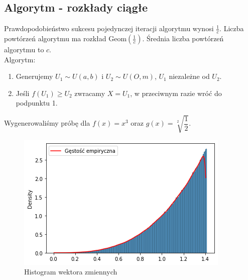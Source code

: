 \documentclass[12pt]{mwart}
\begin{document}
	\subsection{Algorytm - rozkłady ciągłe}
	\noindent Prawdopodobieństwo sukcesu pojedynczej iteracji algorytmu wynosi $\frac{1}{c}$. Liczba powtórzeń algorytmu ma rozkład $\mathrm{Geom}(\frac{1}{c})$. Średnia liczba powtórzeń algorytmu to $c$. \\ 
	
	\noindent Algorytm:	
	\begin{enumerate}
		\item Generujemy $U_1 \sim U(a,b)$ i $U_2 \sim U(O,m)$, $U_1$ niezależne od $U_2$.
		\item Jeśli $f(U_1) \geqslant U_2$ zwracamy $X=U_1$, w przeciwnym razie wróć do podpunktu 1. \\ 
	\end{enumerate}
	
	\noindent Wygenerowaliśmy próbę dla $f(x) = x^{3}$ oraz $g(x) = \sqrt[2]{\dfrac{1}{2}}$.

		\begin{figure}[H]
		\begin{center}
			\includegraphics[scale=0.7]{ao2.png}
			\caption{Histogram wektora zmiennych}
		\end{center}
	\end{figure}
	
\end{document}
